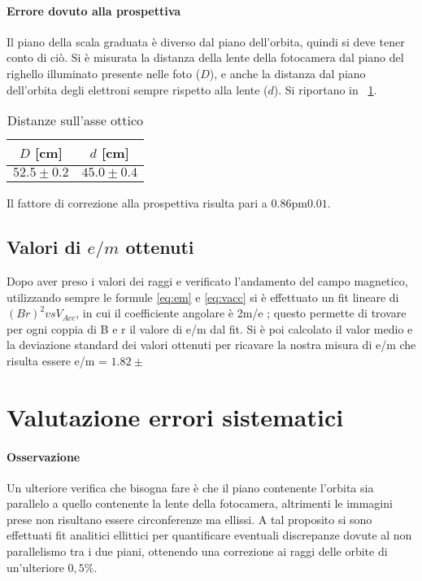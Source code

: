 \documentclass[10pt,a4paper]{article}
\begin{document}
\paragraph{Errore dovuto alla prospettiva} Il piano della scala graduata è diverso dal piano dell'orbita, quindi si deve tener conto di ciò. Si è misurata la distanza della lente della fotocamera dal piano del righello illuminato presente nelle foto ($D$), e anche la distanza dal piano dell'orbita degli elettroni sempre rispetto alla lente ($d$).
Si riportano in \tablename{~\ref{tab:dist}}.
\begin{table}[H]
	\centering
	\begin{tabular}{c|c}
		$D$ [cm] & $d$ [cm]\\
		\hline
		$52.5 \pm 0.2$ & $45.0 \pm 0.4$\\
	\end{tabular}
	\caption{Distanze sull'asse ottico}
	\label{tab:dist}
\end{table}

Il fattore di correzione alla prospettiva risulta pari a $\unit{0.86 \pm 0.01}{}$.

\subsection{Valori di $e/m$ ottenuti}
Dopo aver preso i valori dei raggi e  verificato l'andamento del campo magnetico, utilizzando sempre le formule \eqref{eq:em} e \eqref{eq:vacc} si è effettuato un fit lineare di $(Br)^{2} vs V_{Acc}$, in cui il coefficiente angolare è 2m/e ; questo permette di trovare per ogni coppia di B e r il valore di e/m dal fit. Si è poi calcolato il valor medio e la deviazione standard dei valori ottenuti per ricavare la nostra misura di e/m che risulta essere e/m = $1.82 \pm $

\section{Valutazione errori sistematici}

\paragraph{Osservazione}
Un ulteriore verifica che bisogna fare è che il piano contenente l'orbita sia parallelo a quello contenente la lente della fotocamera, altrimenti le immagini prese non risultano essere circonferenze ma ellissi. A tal proposito si sono effettuati fit analitici ellittici per quantificare eventuali discrepanze dovute al non parallelismo tra i due piani, ottenendo una correzione ai raggi delle orbite di un'ulteriore $0,5\%$.
\end{document}
